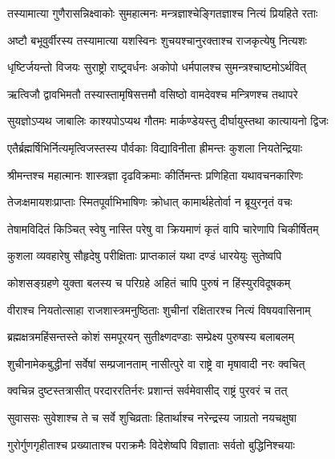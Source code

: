 
\twolineshloka
{तस्यामात्या गुणैरासन्निक्ष्वाकोः सुमहात्मनः}
{मन्त्रज्ञाश्चेङ्गितज्ञाश्च नित्यं प्रियहिते रताः} %

\twolineshloka
{अष्टौ बभूवुर्वीरस्य तस्यामात्या यशस्विनः}
{शुचयश्चानुरक्ताश्च राजकृत्येषु नित्यशः} %

\twolineshloka
{धृष्टिर्जयन्तो विजयः सुराष्ट्रो राष्ट्र्वर्धनः}
{अकोपो धर्मपालश्च सुमन्त्रश्चाष्टमोऽर्थवित्} %

\twolineshloka
{ऋत्विजौ द्वावभिमतौ तस्यास्तामृषिसत्तमौ}
{वसिष्ठो वामदेवश्च मन्त्रिणश्च तथापरे} %

\twolineshloka
{सुयज्ञोऽप्यथ जाबालिः काश्यपोऽप्यथ गौतमः}
{मार्कण्डेयस्तु दीर्घायुस्तथा कात्यायनो द्विजः} %

\twolineshloka
{एतैर्ब्रह्मर्षिभिर्नित्यमृत्विजस्तस्य पौर्वकाः}
{विद्याविनीता ह्रीमन्तः कुशला नियतेन्द्रियाः} %

\twolineshloka
{श्रीमन्तश्च महात्मानः शास्त्रज्ञा दृढविक्रमाः}
{कीर्तिमन्तः प्रणिहिता यथावचनकारिणः} %

\twolineshloka
{तेजःक्षमायशःप्राप्ताः स्मितपूर्वाभिभाषिणः}
{क्रोधात् कामार्थहेतोर्वा न ब्रूयुरनृतं वचः} %

\twolineshloka
{तेषामविदितं किञ्चित् स्वेषु नास्ति परेषु वा}
{क्रियमाणं कृतं वापि चारेणापि चिकीर्षितम्} %

\twolineshloka
{कुशला व्यवहारेषु सौहृदेषु परीक्षिताः}
{प्राप्तकालं यथा दण्डं धारयेयुः सुतेष्वपि} %

\twolineshloka
{कोशसङ्ग्रहणे युक्ता बलस्य च परिग्रहे}
{अहितं चापि पुरुषं न हिंस्युरविदूषकम्} %

\twolineshloka
{वीराश्च नियतोत्साहा राजशास्त्रमनुष्ठिताः}
{शुचीनां रक्षितारश्च नित्यं विषयवासिनाम्} %

\twolineshloka
{ब्रह्मक्षत्रमहिंसन्तस्ते कोशं समपूरयन्}
{सुतीक्ष्णदण्डाः सम्प्रेक्ष्य पुरुषस्य बलाबलम्} %

\twolineshloka
{शुचीनामेकबुद्धीनां सर्वेषां सम्प्रजानताम्}
{नासीत्पुरे वा राष्ट्रे वा मृषावादी नरः क्वचित्} %

\twolineshloka
{क्वचिन्न दुष्टस्तत्रासीत् परदाररतिर्नरः}
{प्रशान्तं सर्वमेवासीद् राष्ट्रं पुरवरं च तत्} %

\twolineshloka
{सुवाससः सुवेशाश्च ते च सर्वे शुचिव्रताः}
{हितार्थाश्च नरेन्द्रस्य जाग्रतो नयचक्षुषा} %

\twolineshloka
{गुरोर्गुणगृहीताश्च प्रख्याताश्च पराक्रमैः}
{विदेशेष्वपि विज्ञाताः सर्वतो बुद्धिनिश्चयाः} %

